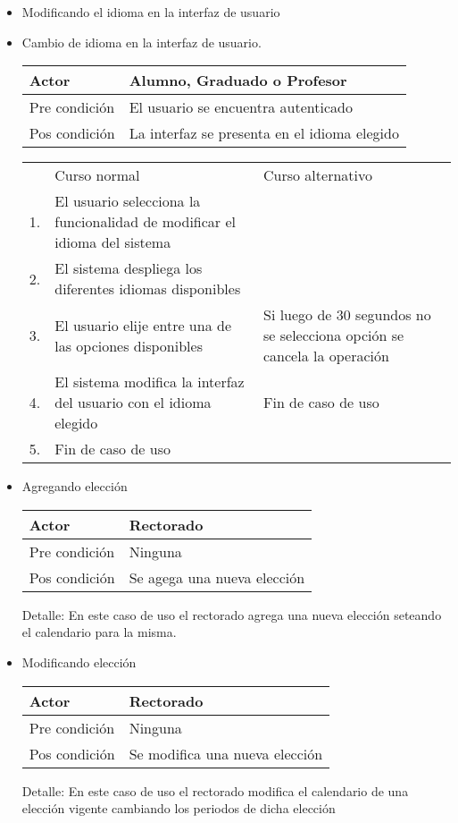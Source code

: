 \begin{itemize}
\bigskip
\item Modificando el idioma en la interfaz de usuario
\bigskip
\item Cambio de idioma en la interfaz de usuario.
\begin{center}
\begin{tabular}{ll}
Actor & Alumno, Graduado o Profesor \\
\hline
Pre condición & El usuario se encuentra autenticado \\
\hline
Pos condición & La interfaz se presenta en el idioma elegido \\
\hline
\end{tabular}
\medskip
\begin{tabular}{c p{4cm}|p{4cm}}
 & Curso normal & Curso alternativo \\
 1. & El usuario selecciona la funcionalidad de modificar el idioma del sistema &   \\
 2. & El sistema despliega los diferentes idiomas disponibles &   \\
 3. & El usuario elije entre una de las opciones disponibles & Si luego de 30 segundos no se selecciona opción se cancela la operación\\
 4. & El sistema modifica la interfaz del usuario con el idioma elegido & Fin de caso de uso\\
 5. & Fin de caso de uso & \\
\end{tabular}
\end{center}






\bigskip
\item Agregando elección
\begin{center}
\begin{tabular}{ll}
Actor & Rectorado \\
\hline
Pre condici\'on & Ninguna \\
\hline
Pos condici\'on & Se agega una nueva elección \\
\hline
\end{tabular}
\medskip
Detalle: En este caso de uso el rectorado agrega una nueva elección seteando el calendario para la misma.
\end{center}


\bigskip
\item Modificando elección
\begin{center}
\begin{tabular}{ll}
Actor & Rectorado \\
\hline
Pre condici\'on & Ninguna \\
\hline
Pos condici\'on & Se modifica una nueva elección \\
\hline
\end{tabular}
\medskip
Detalle: En este caso de uso el rectorado modifica el calendario de una elección vigente cambiando los periodos de dicha elección
\end{center}




\end{itemize}

